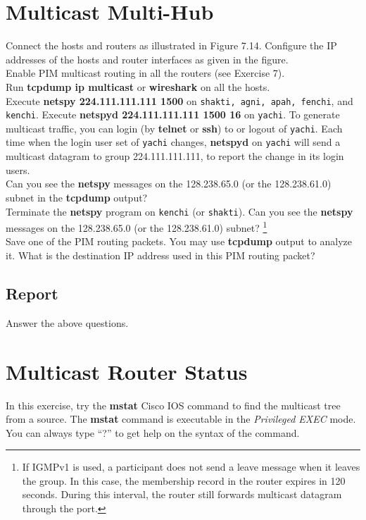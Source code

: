 \documentclass[10pt,a4paper]{article}
\numberwithin{equation}{section}
\numberwithin{figure}{section}
\numberwithin{table}{section}
\begin{document}
\section{Multicast Multi-Hub}
    Connect the hosts and routers as illustrated in Figure 7.14.
    Configure the IP addresses of the hosts and router interfaces as given in the figure.\\
    Enable PIM multicast routing in all the routers (see Exercise 7). \\
    Run \textbf{tcpdump ip multicast} or \textbf{wireshark} on all the hosts. \\
    Execute \textbf{netspy 224.111.111.111 1500} on \texttt{shakti, agni, apah, fenchi}, and \texttt{kenchi}.
    Execute \textbf{netspyd 224.111.111.111 1500 16} on \texttt{yachi}.
    To generate multicast traffic, you can login (by \textbf{telnet} or \textbf{ssh}) to or logout of \texttt{yachi}.
    Each time when the login user set of \texttt{yachi} changes, \textbf{netspyd} on \texttt{yachi} will send a multicast datagram to group 224.111.111.111, to report the change in its login users. \\
    Can you see the \textbf{netspy} messages on the 128.238.65.0 (or the 128.238.61.0) subnet in the \textbf{tcpdump} output? \\
    Terminate the \textbf{netspy} program on \texttt{kenchi} (or \texttt{shakti}).
    Can you see the \textbf{netspy} messages on the 128.238.65.0 (or the 128.238.61.0) subnet?
    \footnote{If IGMPv1 is used, a participant does not send a leave message when it leaves the group.
    In this case, the membership record in the router expires in 120 seconds.
    During this interval, the router still forwards multicast datagram through the port.} \\
    Save one of the PIM routing packets.
    You may use \textbf{tcpdump} output to analyze it.
    What is the destination IP address used in this PIM routing packet?
    \subsection*{Report}
    Answer the above questions.

\section{Multicast Router Status}
    In this exercise, try the \textbf{mstat} Cisco IOS command to find the multicast tree from a source.
    The \textbf{mstat} command is executable in the \textit{Privileged EXEC} mode.
    You can always type “?” to get help on the syntax of the command.
\end{document}
